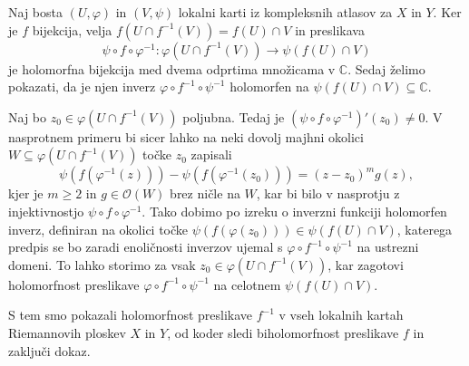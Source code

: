 \documentclass[mat1]{fmfdelo}
\numberwithin{equation}{section}
\newcommand{\C}{\mathbb C}
\newcommand{\inv}{^{-1}}
\newcommand{\hol}[1]{\mathcal{O}(#1)}
\theoremstyle{definition}
\begin{document}
\begin{dokaz}
    Naj bosta $(U, \varphi)$ in $(V, \psi)$ lokalni karti iz kompleksnih atlasov za $X$ in $Y$.
    Ker je $f$ bijekcija, velja $f(U \cap f\inv(V)) = f(U) \cap V$ in preslikava 
    \[
        \psi \circ f \circ \varphi\inv : \varphi(U \cap f\inv(V)) \to \psi(f(U) \cap V)  
    \]
    je holomorfna bijekcija med dvema odprtima množicama v $\C$. Sedaj želimo pokazati, da je njen inverz $\varphi \circ f\inv \circ \psi\inv$ holomorfen na $\psi(f(U) \cap V) \subseteq \C$.

    Naj bo $z_0 \in \varphi(U \cap f\inv(V))$ poljubna. Tedaj je $(\psi \circ f \circ \varphi\inv)'(z_0) \neq 0$. V nasprotnem primeru bi sicer lahko na neki dovolj majhni okolici $W \subseteq \varphi(U \cap f\inv(V))$ točke $z_0$ zapisali 
    \[
        \psi(f(\varphi\inv(z))) - \psi(f(\varphi\inv(z_0))) = (z - z_0)^m g(z),
    \]
    kjer je $m \geq 2$ in $g \in \hol{W}$ brez ničle na $W$, %
    kar bi bilo v nasprotju z injektivnostjo $\psi \circ f \circ \varphi\inv$. Tako dobimo po izreku o inverzni funkciji \cite[izrek 67]{Globevnik} holomorfen inverz, definiran na okolici točke $\psi(f(\varphi(z_0))) \in \psi(f(U) \cap V)$, katerega predpis se bo zaradi enoličnosti inverzov ujemal s $\varphi \circ f\inv \circ \psi\inv$ na ustrezni domeni. To lahko storimo za vsak $z_0 \in \varphi(U \cap f\inv(V))$, kar zagotovi holomorfnost preslikave $\varphi \circ f\inv \circ \psi\inv$ %
    na celotnem $\psi(f(U) \cap V)$. 
    
    S tem smo pokazali holomorfnost preslikave $f\inv$ v vseh lokalnih kartah Riemannovih ploskev $X$ in $Y$, od koder sledi biholomorfnost preslikave $f$ in zaključi dokaz. 
\end{dokaz}
\end{document}
